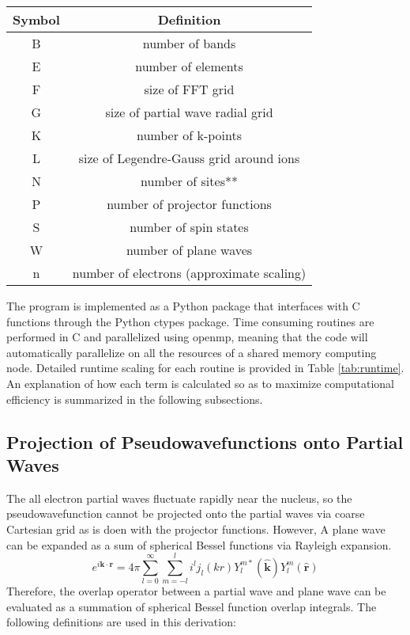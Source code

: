 \documentclass[12pt]{article}
\begin{document}
\begin{table}
\begin{tabular}{c|c}
Symbol & Definition\\
\hline
B & number of bands\\
E & number of elements\\
F & size of FFT grid\\
G & size of partial wave radial grid\\
K & number of k-points\\
L & size of Legendre-Gauss grid around ions\\
N & number of sites**\\
P & number of projector functions\\
S & number of spin states\\
W & number of plane waves\\
n & number of electrons (approximate scaling)
\end{tabular}
\end{table}

The program is implemented as a Python package that interfaces with C functions through
the Python ctypes package. Time consuming routines are performed in C and parallelized
using openmp, meaning that the code will automatically parallelize on all the resources
of a shared memory computing node. Detailed runtime scaling for each routine is
provided in Table \ref{tab:runtime}. An explanation of how each term is calculated
so as to maximize computational efficiency is summarized in the following subsections.

\subsection{Projection of Pseudowavefunctions onto Partial Waves}

The all electron partial waves fluctuate rapidly near the nucleus,
so the pseudowavefunction cannot be projected onto the partial waves
via coarse Cartesian grid as is doen with the projector functions.
However, A plane wave can be expanded as a sum of spherical
Bessel functions via Rayleigh expansion.
\begin{equation}
e^{i\mathbf{k} \cdot \mathbf{r}} = 4\pi \sum_{l=0}^{\infty}\sum_{m=-l}^{l}
i^l j_l(kr)Y_l^{m*}(\mathbf{\hat{k}})Y_l^m(\mathbf{\hat{r}})
\label{eq:pwexp}
\end{equation}
Therefore, the overlap operator between a partial wave and plane wave can be evaluated as a summation
of spherical Bessel function overlap integrals. The following definitions are
used in this derivation:
\end{document}
